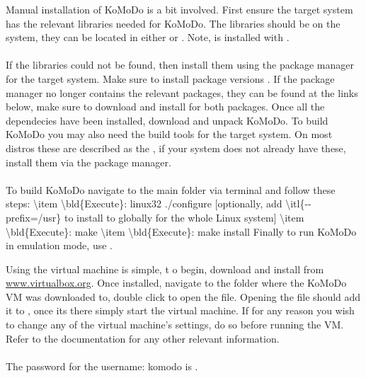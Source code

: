 Manual installation of KoMoDo is a bit involved. First ensure the target system has the relevant libraries needed for KoMoDo. The libraries
should be on the system, they can be located in either  or . Note,  is installed with .\\\\
%
If the libraries could not be found, then install them using the package manager for the target system. Make sure to install package versions . If the package manager no longer contains the relevant packages, they can be found at the links below, make sure to download and install  for both packages.
%
Once all the dependecies have been installed, download and unpack KoMoDo. To build KoMoDo you may also need the build tools for the target system. On most distros these are described as the , if your system does not already have these, install them via the package manager.\\\\
%
To build KoMoDo navigate to the main folder via terminal and follow these steps:
\num{
  \item \bld{Execute}: linux32 ./configure [optionally, add \itl{--prefix=/usr} to install to globally for the whole Linux system]
  \item \bld{Execute}: make
  \item \bld{Execute}: make install
}
%
Finally to run KoMoDo in emulation mode, use .

Using the virtual machine is simple, t o begin, download and install  from \textcolor{blue}{\url{www.virtualbox.org}}. Once installed, navigate to the folder where the KoMoDo VM was downloaded to, double click to open the  file. Opening the file should add it to , once its there simply start the virtual machine. If for any reason you wish to change any of the virtual machine's settings, do so before running the VM. Refer to the  documentation for any other relevant information.\\\\
%
The password for the username: komodo is .
